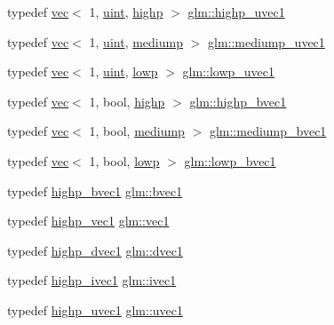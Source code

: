 \begin{DoxyCompactItemize}
\item 
typedef \hyperlink{structglm_1_1vec}{vec}$<$ 1, \hyperlink{group__core__precision_ga4fd29415871152bfb5abd588334147c8}{uint}, \hyperlink{namespaceglm_a36ed105b07c7746804d7fdc7cc90ff25ac6f7eab42eacbb10d59a58e95e362074}{highp} $>$ \hyperlink{group__ext__vec1_ga4e92a1105fa908e8a96971602381e381}{glm\+::highp\+\_\+uvec1}
\item 
typedef \hyperlink{structglm_1_1vec}{vec}$<$ 1, \hyperlink{group__core__precision_ga4fd29415871152bfb5abd588334147c8}{uint}, \hyperlink{namespaceglm_a36ed105b07c7746804d7fdc7cc90ff25a6416f3ea0c9025fb21ed50c4d6620482}{mediump} $>$ \hyperlink{group__ext__vec1_ga30942ba23745b3fd4ec1fbd3068f7de4}{glm\+::mediump\+\_\+uvec1}
\item 
typedef \hyperlink{structglm_1_1vec}{vec}$<$ 1, \hyperlink{group__core__precision_ga4fd29415871152bfb5abd588334147c8}{uint}, \hyperlink{namespaceglm_a36ed105b07c7746804d7fdc7cc90ff25ae161af3fc695e696ce3bf69f7332bc2d}{lowp} $>$ \hyperlink{group__ext__vec1_gaa8d9fb78600ac97161b79c2e83f5a30f}{glm\+::lowp\+\_\+uvec1}
\item 
typedef \hyperlink{structglm_1_1vec}{vec}$<$ 1, bool, \hyperlink{namespaceglm_a36ed105b07c7746804d7fdc7cc90ff25ac6f7eab42eacbb10d59a58e95e362074}{highp} $>$ \hyperlink{group__ext__vec1_gac7fdd0536d878f87393132b3a7f9ef03}{glm\+::highp\+\_\+bvec1}
\item 
typedef \hyperlink{structglm_1_1vec}{vec}$<$ 1, bool, \hyperlink{namespaceglm_a36ed105b07c7746804d7fdc7cc90ff25a6416f3ea0c9025fb21ed50c4d6620482}{mediump} $>$ \hyperlink{group__ext__vec1_ga1e19a89e380de140b1496a824d306155}{glm\+::mediump\+\_\+bvec1}
\item 
typedef \hyperlink{structglm_1_1vec}{vec}$<$ 1, bool, \hyperlink{namespaceglm_a36ed105b07c7746804d7fdc7cc90ff25ae161af3fc695e696ce3bf69f7332bc2d}{lowp} $>$ \hyperlink{group__ext__vec1_ga861bf958322f2909514b1256be428490}{glm\+::lowp\+\_\+bvec1}
\item 
typedef \hyperlink{group__ext__vec1_gac7fdd0536d878f87393132b3a7f9ef03}{highp\+\_\+bvec1} \hyperlink{group__ext__vec1_ga30260c045e085bb8d19eddca772cac61}{glm\+::bvec1}
\item 
typedef \hyperlink{group__ext__vec1_gad8ebf6f2ad36cc3167e77f82b4ae9390}{highp\+\_\+vec1} \hyperlink{group__ext__vec1_ga16030dae9029ed1eab1553a2183bbb79}{glm\+::vec1}
\item 
typedef \hyperlink{group__ext__vec1_ga51e54e6b2fe3962fc44a176eeb3e3fe6}{highp\+\_\+dvec1} \hyperlink{group__ext__vec1_ga8d5252eec287cf34cc18a219a118f9f2}{glm\+::dvec1}
\item 
typedef \hyperlink{group__ext__vec1_gac44dcd92c25ab0d3f5c514137d5460d8}{highp\+\_\+ivec1} \hyperlink{group__ext__vec1_ga946031cea0c22745848ebd873e6facb0}{glm\+::ivec1}
\item 
typedef \hyperlink{group__ext__vec1_ga4e92a1105fa908e8a96971602381e381}{highp\+\_\+uvec1} \hyperlink{group__ext__vec1_ga4e12bc23a3d060164eef452f81d92a03}{glm\+::uvec1}
\end{DoxyCompactItemize}
